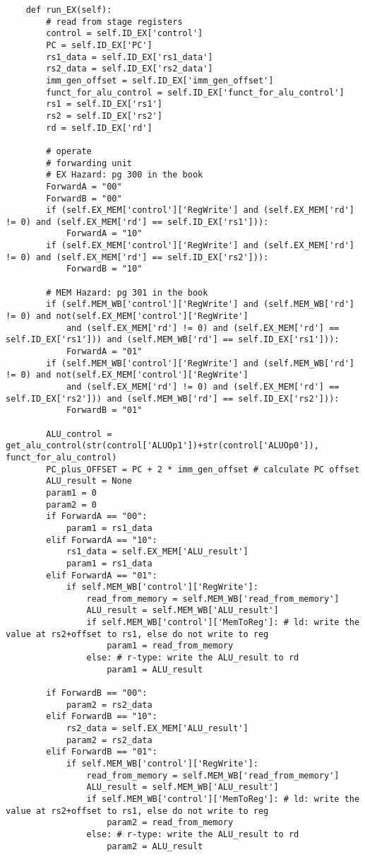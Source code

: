 \begin{lstlisting}
    def run_EX(self):
        # read from stage registers
        control = self.ID_EX['control'] 
        PC = self.ID_EX['PC']
        rs1_data = self.ID_EX['rs1_data']
        rs2_data = self.ID_EX['rs2_data']
        imm_gen_offset = self.ID_EX['imm_gen_offset']
        funct_for_alu_control = self.ID_EX['funct_for_alu_control']
        rs1 = self.ID_EX['rs1']
        rs2 = self.ID_EX['rs2']
        rd = self.ID_EX['rd']

        # operate
        # forwarding unit
        # EX Hazard: pg 300 in the book
        ForwardA = "00"
        ForwardB = "00"
        if (self.EX_MEM['control']['RegWrite'] and (self.EX_MEM['rd'] != 0) and (self.EX_MEM['rd'] == self.ID_EX['rs1'])):
            ForwardA = "10"
        if (self.EX_MEM['control']['RegWrite'] and (self.EX_MEM['rd'] != 0) and (self.EX_MEM['rd'] == self.ID_EX['rs2'])):
            ForwardB = "10"

        # MEM Hazard: pg 301 in the book
        if (self.MEM_WB['control']['RegWrite'] and (self.MEM_WB['rd'] != 0) and not(self.EX_MEM['control']['RegWrite'] 
            and (self.EX_MEM['rd'] != 0) and (self.EX_MEM['rd'] == self.ID_EX['rs1'])) and (self.MEM_WB['rd'] == self.ID_EX['rs1'])):
            ForwardA = "01"
        if (self.MEM_WB['control']['RegWrite'] and (self.MEM_WB['rd'] != 0) and not(self.EX_MEM['control']['RegWrite'] 
            and (self.EX_MEM['rd'] != 0) and (self.EX_MEM['rd'] == self.ID_EX['rs2'])) and (self.MEM_WB['rd'] == self.ID_EX['rs2'])):
            ForwardB = "01"

        ALU_control = get_alu_control(str(control['ALUOp1'])+str(control['ALUOp0']), funct_for_alu_control)
        PC_plus_OFFSET = PC + 2 * imm_gen_offset # calculate PC offset
        ALU_result = None
        param1 = 0
        param2 = 0
        if ForwardA == "00":
            param1 = rs1_data
        elif ForwardA == "10":
            rs1_data = self.EX_MEM['ALU_result']
            param1 = rs1_data 
        elif ForwardA == "01":
            if self.MEM_WB['control']['RegWrite']:
                read_from_memory = self.MEM_WB['read_from_memory']
                ALU_result = self.MEM_WB['ALU_result']
                if self.MEM_WB['control']['MemToReg']: # ld: write the value at rs2+offset to rs1, else do not write to reg
                    param1 = read_from_memory
                else: # r-type: write the ALU_result to rd
                    param1 = ALU_result

        if ForwardB == "00":
            param2 = rs2_data
        elif ForwardB == "10":
            rs2_data = self.EX_MEM['ALU_result']
            param2 = rs2_data 
        elif ForwardB == "01":
            if self.MEM_WB['control']['RegWrite']:
                read_from_memory = self.MEM_WB['read_from_memory']
                ALU_result = self.MEM_WB['ALU_result']
                if self.MEM_WB['control']['MemToReg']: # ld: write the value at rs2+offset to rs1, else do not write to reg
                    param2 = read_from_memory
                else: # r-type: write the ALU_result to rd
                    param2 = ALU_result


\end{lstlisting}
